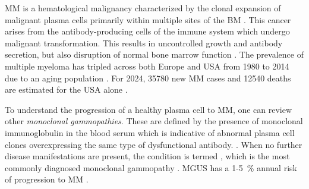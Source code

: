 





%
\label{sec:intro_myeloma}%
\ac{MM} is a hematological malignancy characterized by the clonal expansion of
malignant plasma cells primarily within multiple sites of the \ac{BM}
\cite{yangPathogenesisTreatmentMultiple2022}. This cancer arises from the
antibody-producing cells of the immune system  which
undergo malignant transformation. This results in uncontrolled growth and
antibody secretion, but also disruption of normal bone marrow function
. The prevalence of
multiple myeloma has tripled across both Europe and USA from 1980 to 2014 due to
an aging population \cite{ociasTrendsHematologicalCancer2016,
turessonRapidlyChangingMyeloma2018}. For 2024, 35780 new \ac{MM} cases and 12540
deaths are estimated for the USA alone \cite{siegelCancerStatistics20242024}.

To understand the progression of a healthy plasma cell to \ac{MM}, one can
review other \emph{monoclonal gammopathies}. These are defined by the presence
of monoclonal immunoglobulin in the blood serum which is indicative of abnormal
plasma cell clones overexpressing the same type of dysfunctional antibody.
\cite{kyleMonoclonalGammopathyUndetermined1997,
    fermandMonoclonalGammopathyClinical2018}. When no further disease manifestations
are present, the condition is termed , which is the most commonly
diagnosed monoclonal gammopathy \cite{kyleMonoclonalGammopathyUndetermined1997}.
\ac{MGUS} has a 1-\SI{5}{\percent} annual risk of progression to \ac{MM}
\cite{rajkumarInternationalMyelomaWorking2014}.


